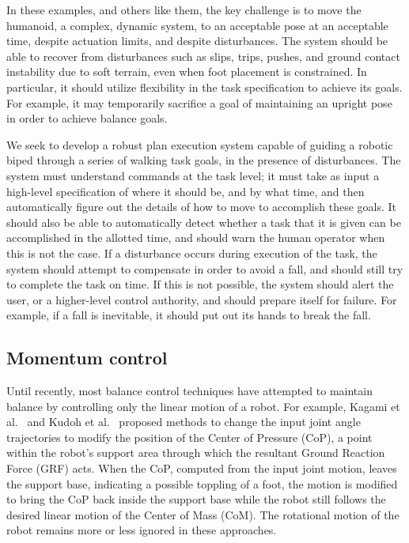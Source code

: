 \documentclass{llncs}
\begin{document}
In these examples, and others like them, the key challenge is to move the humanoid,
a complex, dynamic system, to an acceptable pose at an acceptable time, despite actuation limits, and despite disturbances.
The system should be able to recover from disturbances such as slips, trips, pushes, and ground contact instability due to soft terrain, 
even when foot placement is constrained.  
In particular, it should utilize flexibility in the task specification to achieve its goals.
For example, it may temporarily sacrifice a goal of maintaining an upright pose in order to achieve balance goals.

We seek to develop a robust plan execution system capable of guiding a robotic biped through a series of walking task goals, in the presence of disturbances.  
The system must understand commands at the task level;  it must take as input a high-level specification of where it should be, and by what time, and then 
automatically figure out the details of how to move to accomplish these goals.  
It should also be able to automatically detect whether a task that it is given can be accomplished in the allotted time, and should warn the human operator 
when this is not the case.  
If a disturbance occurs during execution of the task, the system should attempt to compensate in order to avoid a fall, and should still try to 
complete the task on time.  
If this is not possible, the system should alert the user, or a higher-level control authority, and should prepare itself for failure.
For example, if a fall is inevitable, it should put out its hands to break the fall.


\subsection{Momentum control}


Until recently, most balance control techniques
have attempted to maintain balance by controlling
only the linear motion of a robot.
For example, Kagami et al.~\cite{Kagami00} and
Kudoh et al.~\cite{Kudoh02} proposed methods to change
the input joint angle trajectories to modify the position of the
Center of Pressure (CoP), a point within the robot's support area through
which the resultant Ground Reaction Force (GRF) acts.
When the CoP, computed from the input joint motion, leaves the
support base, indicating a possible toppling of a foot,
the motion is modified to bring the CoP back inside the
support base while the robot still follows the desired linear
motion of the Center of Mass (CoM). The rotational motion of the
robot remains more or less ignored in these approaches.
\end{document}
